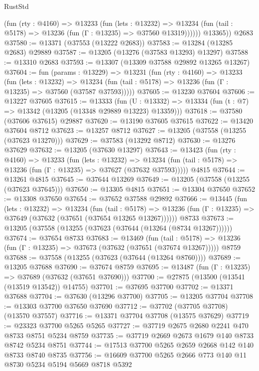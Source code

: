\begin{lexlean}{RustStd}
\begin{coremodule}
            (fun (rty : @4160) =>
            @13233
              (fun (lets : @13232) =>
              @13234 (fun (tail : @5178) => @13236 (fun (Γ : @13235) => @37560 @13319))))))
        @13365))
    @2683
@37580 := @13371 (@37553 (@13222 @2683))
@37583 := @13284 (@13285 @2683) @29889
@37587 := @13205 (@13276 (@37583 @13293) @13297)
@37588 := @13310 @2683
@37593 := @13307 (@13309 @37588 @29892 @13265 @13267)
@37604 := fun (params : @13229) =>
  @13231
    (fun (rty : @4160) =>
    @13233
      (fun (lets : @13232) =>
      @13234 (fun (tail : @5178) => @13236 (fun (Γ : @13235) => @37560 (@37587 @37593)))))
@37605 := @13230 @37604
@37606 := @13227 @37605
@37615 := @13333
    (fun (U : @13332) => @13334 (fun (t : @7) => @13342 (@13205 (@13348 @29889 @13223) @13359)))
@37618 := @37580 (@37606 @37615) @29887
@37620 := @13190 @37605 @37615
@37622 := @13420 @37604 @8712
@37623 := @13257 @8712
@37627 := @13205 (@37558 (@13255 (@37623 @13270)))
@37629 := @37583 (@13292 @8712)
@37630 := @13276 @37629
@37632 := @13205 (@37630 @13297)
@37643 := @13423
    (fun (rty : @4160) =>
    @13233
      (fun (lets : @13232) =>
      @13234 (fun (tail : @5178) => @13236 (fun (Γ : @13235) => @37627 (@37632 @37593)))))
    @4815
@37644 := @13261 @4815
@37645 := @37644 @13269
@37649 := @13205 (@37558 (@13255 (@37623 @37645)))
@37650 := @13305 @4815
@37651 := @13304 @37650
@37652 := @13308 @37650
@37654 := @37652 @37588 @29892
@37666 := @13445
    (fun (lets : @13232) =>
    @13234
      (fun (tail : @5178) =>
      @13236 (fun (Γ : @13235) => @37649 (@37632 (@37651 (@37654 @13265 @13267))))))
    @8733
@37673 := @13205 (@37558 (@13255 (@37623 (@37644 (@13264 (@8734 @13267))))))
@37674 := @37654 @8733
@37683 := @13469
    (fun (tail : @5178) => @13236 (fun (Γ : @13235) => @37673 (@37632 (@37651 (@37674 @13267)))))
    @8759
@37688 := @37558 (@13255 (@37623 (@37644 (@13264 @8760))))
@37689 := @13205 @37688
@37690 := @37674 @8759
@37695 := @13487 (fun (Γ : @13235) => @37689 (@37632 (@37651 @37690)))
@37700 := @27875 (@13500 (@13541 (@13519 @13542)) @14755)
@37701 := @37695 @37700
@37702 := @13371 @37688
@37704 := @37630 (@13296 @37700)
@37705 := @13205 @37704
@37708 := @13303 @37700 @37650 @37690
@37712 := @37702 (@37705 @37708) (@13570 @37557)
@37716 := @13371 @37704 @37708 (@13575 @37629)
@37719 := @23323 @37700 @5265 @5265
@37727 := @37719 @2675 @2680 @2241 @470 @8733 @8751 @5234 @8759
@37735 := @37719 @2669 @2673 @1679 @140 @8733 @8742 @5234 @8751
@37744 := @17513 @37700 @5265 @2659 @2668 @142 @140 @8733 @8740 @8735
@37756 := @16609 @37700 @5265 @2666 @773 @140 @11 @8730 @5234 @5194 @5669 @8718 @5392

\end{coremodule}
\end{lexlean}
